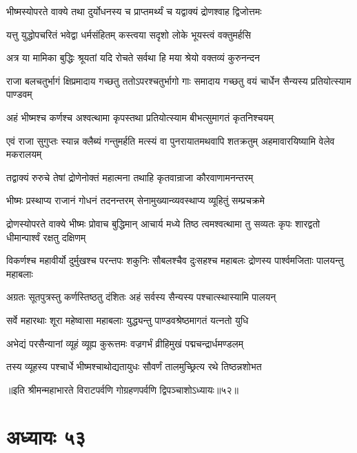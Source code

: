 
\twolineshloka
{भीष्मस्योपरते वाक्ये तथा दुर्योधनस्य च}
{प्राप्तमर्थ्यं च यद्वाक्यं द्रोणश्वाह द्विजोत्तमः}


\twolineshloka
{यत्तु युद्धोपचरितं भवेद्वा धर्मसंहितम्}
{कस्त्वया सदृशो लोके भूयस्त्वं वक्तुमर्हसि}


\twolineshloka
{अत्र या मामिका बुद्धिः श्रूयतां यदि रोचते}
{सर्वथा हि मया श्रेयो वक्तव्यं कुरुनन्दन}


\threelineshloka
{राजा बलचतुर्भागं क्षिप्रमादाय गच्छतु}
{ततोऽपरश्चतुर्भागो गाः समादाय गच्छतु}
{वयं चार्धेन सैन्यस्य प्रतियोत्स्याम पाण्डवम्}


\twolineshloka
{अहं भीष्मश्च कर्णश्च अश्वत्थामा कृपस्तथा}
{प्रतियोत्स्याम बीभत्सुमागतं कृतनिश्चयम्}


\threelineshloka
{एवं राजा सुगुप्तः स्यान्न क्लैब्यं गन्तुमर्हति}
{मत्स्यं वा पुनरायातमथवापि शतक्रतुम्}
{अहमावारयिष्यामि वेलेव मकरालयम्}



\twolineshloka
{तद्वाक्यं रुरुचे तेषां द्रोणेनोक्तं महात्मना}
{तथाहि कृतवान्राजा कौरवाणामनन्तरम्}


\twolineshloka
{भीष्मः प्रस्थाप्य राजानं गोधनं तदनन्तरम्}
{सेनामुख्यान्व्यवस्थाप्य व्यूहितुं सम्प्रचक्रमे}


\threelineshloka
{द्रोणस्योपरते वाक्ये भीष्मः प्रोवाच बुद्धिमान्}
{आचार्य मध्ये तिष्ठ त्वमश्वत्थामा तु सव्यतः}
{कृपः शारद्वतो धीमान्पार्श्वं रक्षतु दक्षिणम्}


\threelineshloka
{विकर्णश्च महावीर्यो दुर्मुखश्च परन्तपः}
{शकुनिः सौबलश्चैव दुःसहश्च महाबलः}
{द्रोणस्य पार्श्वमजिताः पालयन्तु महाबलाः}


\twolineshloka
{अग्रतः सूतपुत्रस्तु कर्णस्तिष्ठतु दंशितः}
{अहं सर्वस्य सैन्यस्य पश्चात्स्थास्यामि पालयन्}


\twolineshloka
{सर्वे महारथाः शूरा महेष्वासा महाबलाः}
{युद्ध्यन्तु पाण्डवश्रेष्ठमागतं यत्नतो युधि}



\twolineshloka
{अभेद्यं परसैन्यानां व्यूहं व्यूह्य कुरूत्तमः}
{वज्रगर्भं व्रीहिमुखं पद्मचन्द्रार्धमण्डलम्}


\twolineshloka
{तस्य व्यूहस्य पश्चार्धे भीष्मश्चाथोद्यतायुधः}
{सौवर्णं तालमुच्छ्रित्य रथे तिष्ठन्नशोभत}

॥इति श्रीमन्महाभारते विराटपर्वणि गोग्रहणपर्वणि द्विपञ्चाशोऽध्यायः॥५२॥

\chapter{अध्यायः ५३}

